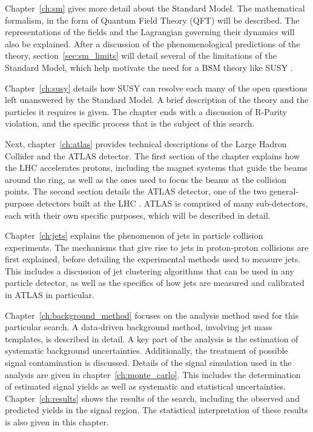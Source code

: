 Chapter~\ref{ch:sm} gives more detail about the Standard Model.
The mathematical formalism, in the form of Quantum Field Theory (QFT) will be described.
The representations of the fields and the Lagrangian governing their dynamics will also be explained.
After a discussion of the phenomenological predictions of the theory, section~\ref{sec:sm_limits} will detail
several of the limitations of the Standard Model, which help motivate the need for a BSM theory like SUSY .

Chapter~\ref{ch:susy} details how SUSY can resolve each many of the open questions left unanswered by the Standard Model.
A brief description of the theory and the particles it requires is given.
The chapter ends with a discussion of R-Parity violation, and the specific process that is the subject of this search.

Next, chapter~\ref{ch:atlas} provides technical descriptions of the Large Hadron Collider and the ATLAS detector.
The first section of the chapter explains how the LHC accelerates protons, including the magnet systems that guide the beams
around the ring, as well as the ones used to focus the beams at the collision points.
The second section details the ATLAS detector, one of the two general-purpose detectors built at the LHC .
ATLAS is comprised of many sub-detectors, each with their own specific purposes, which will be described in detail.

Chapter~\ref{ch:jets} explains the phenomenon of jets in particle collision experiments.
The mechanisms that give rise to jets in proton-proton collisions are first explained,
before detailing the experimental methods used to measure jets.
This includes a discussion of jet clustering algorithms that can be used in any particle detector,
as well as the specifics of how jets are measured and calibrated in ATLAS in particular.

Chapter~\ref{ch:background_method} focuses on the analysis method used for this particular search.
A data-driven background method, involving jet mass templates, is described in detail.
A key part of the analysis is the estimation of systematic background uncertainties.
Additionally, the treatment of possible signal contamination is discussed.
Details of the signal simulation used in the analysis are given in chapter~\ref{ch:monte_carlo}.
This includes the determination of estimated signal yields as well as systematic and statistical uncertainties.
Chapter~\ref{ch:results} shows the results of the search, including the observed and predicted yields in the signal region.
The statistical interpretation of these results is also given in this chapter.